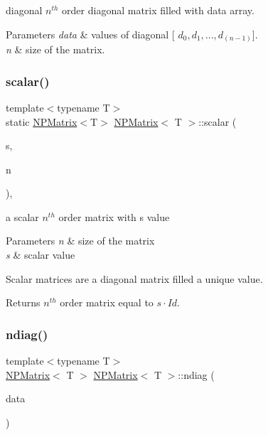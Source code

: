 diagonal $ n^{th} $ order diagonal matrix filled with data array. 


\begin{DoxyParams}{Parameters}
{\em data} & values of diagonal {\ttfamily \mbox{[}} $ d_0, d_1, ..., d_{(n-1)} ${\ttfamily \mbox{]}}. \\
\hline
{\em n} & size of the matrix. \\
\hline
\end{DoxyParams}
\mbox{\label{class_n_p_matrix_a3195b8dd4a279c3018122c3053997f8c}} 
\subsubsection{\texorpdfstring{scalar()}{scalar()}}
{\footnotesize\ttfamily template$<$typename T$>$ \\
static \mbox{\hyperlink{class_n_p_matrix}{N\+P\+Matrix}}$<$T$>$ \mbox{\hyperlink{class_n_p_matrix}{N\+P\+Matrix}}$<$ T $>$\+::scalar (\begin{DoxyParamCaption}\item[{T}]{s,  }\item[{\mbox{\hyperlink{group___n_algebra_ga1b140a2034db3f5dfe18a987745df43a}{ul\+\_\+t}}}]{n }\end{DoxyParamCaption})\hspace{0.3cm}{\ttfamily [inline]}, {\ttfamily [static]}}



a scalar $ n^{th} $ order matrix with {\ttfamily s} value 


\begin{DoxyParams}{Parameters}
{\em n} & size of the matrix \\
\hline
{\em s} & scalar value\\
\hline
\end{DoxyParams}
Scalar matrices are a diagonal matrix filled a unique value. \begin{DoxyReturn}{Returns}
$ n^{th} $ order matrix equal to $ s \cdot Id $. 
\end{DoxyReturn}
\mbox{\label{class_n_p_matrix_a16aa6a18c33005300049ab1a39cbfbc2}} 
\subsubsection{\texorpdfstring{ndiag()}{ndiag()}}
{\footnotesize\ttfamily template$<$typename T$>$ \\
\mbox{\hyperlink{class_n_p_matrix}{N\+P\+Matrix}}$<$ T $>$ \mbox{\hyperlink{class_n_p_matrix}{N\+P\+Matrix}}$<$ T $>$\+::ndiag (\begin{DoxyParamCaption}\item[{const std\+::vector$<$ \mbox{\hyperlink{class_n_vector}{N\+Vector}}$<$ T $>$ $>$ \&}]{data }\end{DoxyParamCaption})\hspace{0.3cm}{\ttfamily [static]}}



